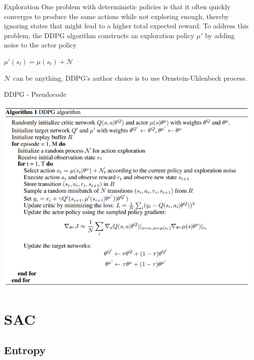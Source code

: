 \documentclass{beamer}
\begin{document}
\begin{frame}{Exploration}
One problem with deterministic policies is that it often quickly converges to produce the same actions while not exploring enough, thereby ignoring states that might lead to a higher total expected reward. To address this problem, the DDPG algorithm constructs an exploration policy $\mu'$ by adding noise to the actor policy
\begin{center}
$\mu'(s_t) = \mu(s_t) + \mathcal{N}$
\end{center}
$\mathcal{N}$ can be anything, DDPG's author choice is to use Ornstein-Uhlenbeck process.
\end{frame}


\begin{frame}{DDPG - Pseudocode}
\begin{center}
     \includegraphics[scale=0.63]{DDPG-Pseudocode.png}
\end{center}
   
\end{frame}

    


\section{SAC}

\subsection{Entropy}
\end{document}
